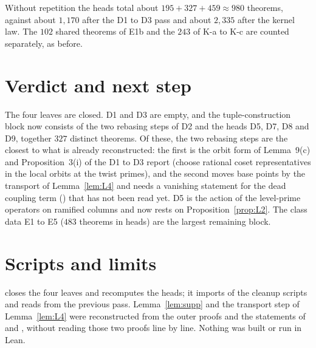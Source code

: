 \documentclass[11pt]{article}
\theoremstyle{definition}
\theoremstyle{remark}
\begin{document}
\noindent Without repetition the heads total about $195+327+459\approx980$ theorems, against about $1{,}170$ after the D1 to D3 pass and about $2{,}335$ after the kernel law. The $102$ shared theorems of E1b and the $243$ of K-a to K-c are counted separately, as before.

\section{Verdict and next step}

The four leaves are closed. D1 and D3 are empty, and the tuple-construction block now consists of the two rebasing steps of D2 and the heads D5, D7, D8 and D9, together $327$ distinct theorems. Of these, the two rebasing steps are the closest to what is already reconstructed: the first is the orbit form of Lemma~9(c) and Proposition~3(i) of the D1 to D3 report (choose rational coset representatives in the local orbits at the twist primes), and the second moves base points by the transport of Lemma~\ref{lem:L4} and needs a vanishing statement for the dead coupling term () that has not been read yet. D5 is the action of the level-prime operators on ramified columns and now rests on Proposition~\ref{prop:L2}. The class data E1 to E5 ($483$ theorems in heads) are the largest remaining block.

\appendix
\section{Scripts and limits}
 closes the four leaves and recomputes the heads; it imports  of the cleanup scripts and reads  from the previous pass. Lemma~\ref{lem:supp} and the transport step of Lemma~\ref{lem:L4} were reconstructed from the outer proofs and the statements of  and , without reading those two proofs line by line. Nothing was built or run in Lean.
\end{document}
